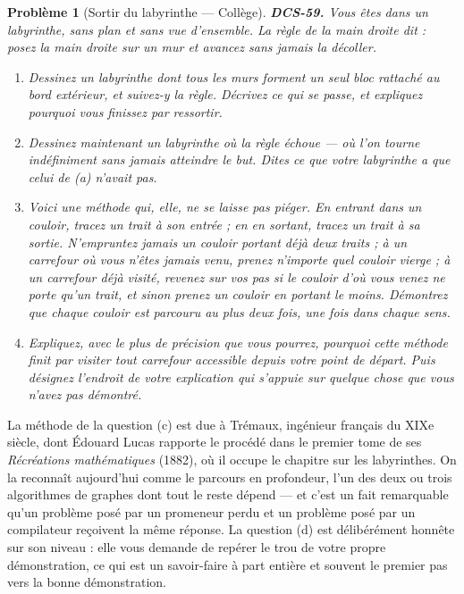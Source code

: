 \documentclass[11pt]{article}
\newtheorem{problem}{Problème}
\begin{document}
\begin{problem}[{Sortir du labyrinthe --- Collège}]
\textbf{DCS-59.} Vous êtes dans un labyrinthe, sans plan et sans vue d'ensemble. La
\og{} règle de la main droite \fg{} dit : posez la main droite sur un mur et avancez sans jamais la
décoller.
\begin{enumerate}
\item[(a)] Dessinez un labyrinthe dont tous les murs forment un seul bloc rattaché au bord
extérieur, et suivez-y la règle. Décrivez ce qui se passe, et expliquez pourquoi vous
finissez par ressortir.
\item[(b)] Dessinez maintenant un labyrinthe où la règle échoue --- où l'on tourne indéfiniment sans
jamais atteindre le but. Dites ce que votre labyrinthe a que celui de (a) n'avait pas.
\item[(c)] Voici une méthode qui, elle, ne se laisse pas piéger. En entrant dans un couloir, tracez
un trait à son entrée ; en en sortant, tracez un trait à sa sortie. N'empruntez jamais un
couloir portant déjà deux traits ; à un carrefour où vous n'êtes jamais venu, prenez
n'importe quel couloir vierge ; à un carrefour déjà visité, revenez sur vos pas si le couloir
d'où vous venez ne porte qu'un trait, et sinon prenez un couloir en portant le moins.
Démontrez que chaque couloir est parcouru au plus deux fois, une fois dans chaque sens.
\item[(d)] Expliquez, avec le plus de précision que vous pourrez, pourquoi cette méthode finit par
visiter tout carrefour accessible depuis votre point de départ. Puis désignez l'endroit de
votre explication qui s'appuie sur quelque chose que vous n'avez pas démontré.
\end{enumerate}

\end{problem}

\noindent La méthode de la question (c) est due à Trémaux, ingénieur français du
XIXe siècle, dont Édouard Lucas rapporte le procédé dans le premier tome de ses
\textit{Récréations mathématiques} (1882), où il occupe le chapitre sur les labyrinthes. On la
reconnaît aujourd'hui comme le parcours en profondeur, l'un des deux ou trois algorithmes de
graphes dont tout le reste dépend --- et c'est un fait remarquable qu'un problème posé par un
promeneur perdu et un problème posé par un compilateur reçoivent la même réponse. La question
(d) est délibérément honnête sur son niveau : elle vous demande de repérer le trou de votre
propre démonstration, ce qui est un savoir-faire à part entière et souvent le premier pas
vers la bonne démonstration.
\end{document}
